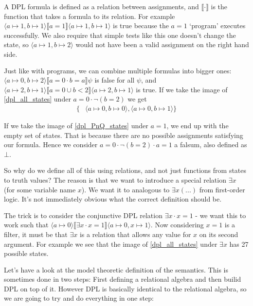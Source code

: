 \documentclass[12pt]{article}
\begin{document}
A DPL formula is defined as a relation between assignments, and $\llbracket\cdot\rrbracket$ is the function that takes a formula to its relation. For example $\langle a\mapsto1,b\mapsto1\rangle\llbracket a=1\rrbracket\langle a\mapsto1,b\mapsto1\rangle$ is true because the $a=1$ `program' executes successfully. We also require that simple tests like this one doesn't change the state, so $\langle a\mapsto 1,b\mapsto2\rangle$ would not have been a valid assignment on the right hand side.

Just like with programs, we can combine multiple formulas into bigger ones: $\langle a\mapsto0,b\mapsto2\rangle\llbracket a=0\cdot b=a\rrbracket\psi$ is false for all $\psi$, and $\langle a\mapsto2,b\mapsto1\rangle\llbracket a=0\cup b<2\rrbracket\langle a\mapsto2,b\mapsto1\rangle$ is true. If we take the image of \eqref{dpl_all_states} under $a=0\cdot\neg (b=2)$ we get
%
\begin{align}
\{&\langle a\mapsto0,b\mapsto0\rangle, \langle a\mapsto0,b\mapsto1\rangle\} \label{dpl_PnQ_states}
\end{align}

If we take the image of \eqref{dpl_PnQ_states} under $a=1$, we end up with the empty set of states. That is because there are no possible assignments satisfying our formula. Hence we consider $a=0\cdot\neg (b=2)\cdot a=1$ a falsum, also defined as $\bot$.

So why do we define all of this using relations, and not just functions from states to truth values? The reason is that we want to introduce a special relation $\exists x$ (for some variable name $x$). We want it to analogous to $\exists x(...)$ from first-order logic. It's not immediately obvious what the correct definition should be.

The trick is to consider the conjunctive DPL relation $\exists x\cdot x=1$ - we want this to work such that $\langle a\mapsto0\rangle\llbracket\exists x\cdot x=1\rrbracket\langle a\mapsto0,x\mapsto1\rangle$. Now considering $x=1$ is a filter, it must be that $\exists x$ is a relation that allows any value for $x$ on its second argument. For example we see that the image of \eqref{dpl_all_states} under $\exists x$ has 27 possible states.

Let's have a look at the model theoretic definition of the semantics. This is sometimes done in two steps: First defining a relational algebra and then builid DPL on top of it. However DPL is basically identical to the relational algebra, so we are going to try and do everything in one step:
\end{document}
